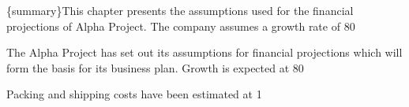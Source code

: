 

\nonumsidenote\{summary\}This chapter presents the assumptions used for the financial projections of Alpha Project. The company assumes a growth rate of 80%

The Alpha Project has set out its assumptions for financial projections which will form the basis for its business plan. Growth is expected at 80%

Packing and shipping costs have been estimated at 1%

